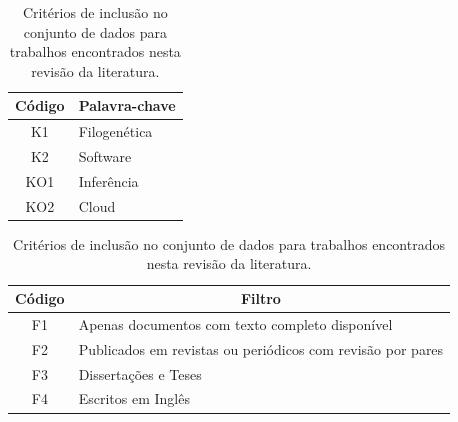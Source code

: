 \documentclass[english,brazilian]{UNISINOSmonografia} %
\newcommand\defaultFigureWidth{0.9}
\begin{document}
\begin{table}[tb]
\centering%
\begin{minipage}{\defaultFigureWidth\textwidth}
	\begin{minipage}{.4\textwidth}
		\caption{Palavras-chaves utilizadas na composição dos termos de busca desta revisão da literatura.}
		\label{tab:survey-keywords}
		\vspace{1ex}
		\begin{tabularx}{\textwidth}{cX}
			\toprule
			Código & \multicolumn{1}{c}{Palavra-chave} \\ 
			\midrule
			K1 & Filogenética \\
			K2 & Software \\
			KO1 & Inferência \\
			KO2 & Cloud \\
			\bottomrule
		\end{tabularx}
	\end{minipage}
	\hfill
	\begin{minipage}{.55\textwidth}
		\caption{Critérios de inclusão no conjunto de dados para trabalhos encontrados nesta revisão da literatura.}
		\label{tab:survey-filters}
		\vspace{1ex}
		\renewcommand {\tabularxcolumn}[1]{>{\arraybackslash}m{#1}}
		\begin{tabularx}{\textwidth}{cX}
			\toprule
			Código & \multicolumn{1}{c}{Filtro} \\ 
			\midrule
			F1 & Apenas documentos com texto completo disponível \\
			F2 & Publicados em revistas ou periódicos com revisão por pares \\
			F3 & Dissertações e Teses \\
			F4 & Escritos em Inglês \\
			\bottomrule
		\end{tabularx}
	\end{minipage}
\end{minipage}
\end{table}
\end{document}

